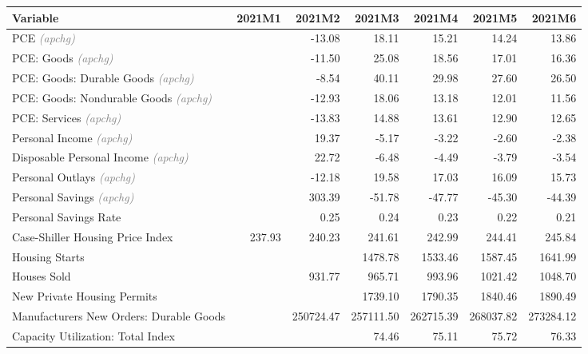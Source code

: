 \documentclass[11pt, letterpaper]{article}\usepackage[]{graphicx}\usepackage[]{color}
\begin{document}
\begin{table}[H]
\centering
\begingroup\fontsize{10pt}{12pt}\selectfont
\begin{tabular}{lrrrrrr}
  \hline
Variable & 2021M1 & 2021M2 & 2021M3 & 2021M4 & 2021M5 & 2021M6 \\ 
  \hline
PCE \textit{\footnotesize\textcolor{gray}{(apchg)}} &  & -13.08 & 18.11 & 15.21 & 14.24 & 13.86 \\ 
  PCE: Goods \textit{\footnotesize\textcolor{gray}{(apchg)}} &  & -11.50 & 25.08 & 18.56 & 17.01 & 16.36 \\ 
  PCE: Goods: Durable Goods \textit{\footnotesize\textcolor{gray}{(apchg)}} &  & -8.54 & 40.11 & 29.98 & 27.60 & 26.50 \\ 
  PCE: Goods: Nondurable Goods \textit{\footnotesize\textcolor{gray}{(apchg)}} &  & -12.93 & 18.06 & 13.18 & 12.01 & 11.56 \\ 
  PCE: Services \textit{\footnotesize\textcolor{gray}{(apchg)}} &  & -13.83 & 14.88 & 13.61 & 12.90 & 12.65 \\ 
  Personal Income \textit{\footnotesize\textcolor{gray}{(apchg)}} &  & 19.37 & -5.17 & -3.22 & -2.60 & -2.38 \\ 
  Disposable Personal Income \textit{\footnotesize\textcolor{gray}{(apchg)}} &  & 22.72 & -6.48 & -4.49 & -3.79 & -3.54 \\ 
  Personal Outlays \textit{\footnotesize\textcolor{gray}{(apchg)}} &  & -12.18 & 19.58 & 17.03 & 16.09 & 15.73 \\ 
  Personal Savings \textit{\footnotesize\textcolor{gray}{(apchg)}} &  & 303.39 & -51.78 & -47.77 & -45.30 & -44.39 \\ 
  Personal Savings Rate &  & 0.25 & 0.24 & 0.23 & 0.22 & 0.21 \\ 
  Case-Shiller Housing Price Index & 237.93 & 240.23 & 241.61 & 242.99 & 244.41 & 245.84 \\ 
  Housing Starts &  &  & 1478.78 & 1533.46 & 1587.45 & 1641.99 \\ 
  Houses Sold &  & 931.77 & 965.71 & 993.96 & 1021.42 & 1048.70 \\ 
  New Private Housing Permits &  &  & 1739.10 & 1790.35 & 1840.46 & 1890.49 \\ 
  Manufacturers New Orders: Durable Goods &  & 250724.47 & 257111.50 & 262715.39 & 268037.82 & 273284.12 \\ 
  Capacity Utilization: Total Index &  &  & 74.46 & 75.11 & 75.72 & 76.33 \\ 

\end{tabular}
\end{table}
\end{document}
